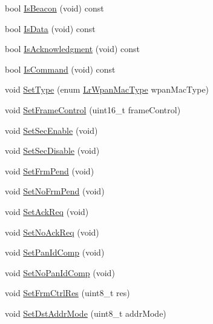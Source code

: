 \begin{DoxyCompactItemize}
\item 
bool \hyperlink{classns3_1_1LrWpanMacHeader_a7e37a9a6b0e41dc2cc7e338293a54e59}{Is\+Beacon} (void) const 
\item 
bool \hyperlink{classns3_1_1LrWpanMacHeader_abcfe545d43abb3f484c92531d04e5095}{Is\+Data} (void) const 
\item 
bool \hyperlink{classns3_1_1LrWpanMacHeader_a76e48364df7dc28eb24d2c46252fd81c}{Is\+Acknowledgment} (void) const 
\item 
bool \hyperlink{classns3_1_1LrWpanMacHeader_ae2e5156cc329c6330180c810b3e446a7}{Is\+Command} (void) const 
\item 
void \hyperlink{classns3_1_1LrWpanMacHeader_a6adb1cb7c43b2dfa867f4deef0c33c0b}{Set\+Type} (enum \hyperlink{classns3_1_1LrWpanMacHeader_a09363d4738e8ab00b82db8268b65d7a0}{Lr\+Wpan\+Mac\+Type} wpan\+Mac\+Type)
\item 
void \hyperlink{classns3_1_1LrWpanMacHeader_aa550a464a5fd8f08657eafc59c5f3c48}{Set\+Frame\+Control} (uint16\+\_\+t frame\+Control)
\item 
void \hyperlink{classns3_1_1LrWpanMacHeader_a0e94b791c93b52a6956f844bc2e8a3fa}{Set\+Sec\+Enable} (void)
\item 
void \hyperlink{classns3_1_1LrWpanMacHeader_acc5e51156ce28e540d2def4ef0d108f4}{Set\+Sec\+Disable} (void)
\item 
void \hyperlink{classns3_1_1LrWpanMacHeader_a2ae13f9a14c628742496df5d1b28d497}{Set\+Frm\+Pend} (void)
\item 
void \hyperlink{classns3_1_1LrWpanMacHeader_afc3dd54d6787e320643903d2683bb36a}{Set\+No\+Frm\+Pend} (void)
\item 
void \hyperlink{classns3_1_1LrWpanMacHeader_a2e1a09ac51757d311828890bae32e8c0}{Set\+Ack\+Req} (void)
\item 
void \hyperlink{classns3_1_1LrWpanMacHeader_a00a595a39fa838159d1b49732d5d5e13}{Set\+No\+Ack\+Req} (void)
\item 
void \hyperlink{classns3_1_1LrWpanMacHeader_a2fedfc908991b7d38889dbc85039c513}{Set\+Pan\+Id\+Comp} (void)
\item 
void \hyperlink{classns3_1_1LrWpanMacHeader_ab02a8eed6b17d8ba05e5f5f0be8fab41}{Set\+No\+Pan\+Id\+Comp} (void)
\item 
void \hyperlink{classns3_1_1LrWpanMacHeader_a2a36b5b67590856c81c3145552db22a4}{Set\+Frm\+Ctrl\+Res} (uint8\+\_\+t res)
\item 
void \hyperlink{classns3_1_1LrWpanMacHeader_a8513915d98840c7e2dae25c7f69b71ad}{Set\+Dst\+Addr\+Mode} (uint8\+\_\+t addr\+Mode)

\end{DoxyCompactItemize}
